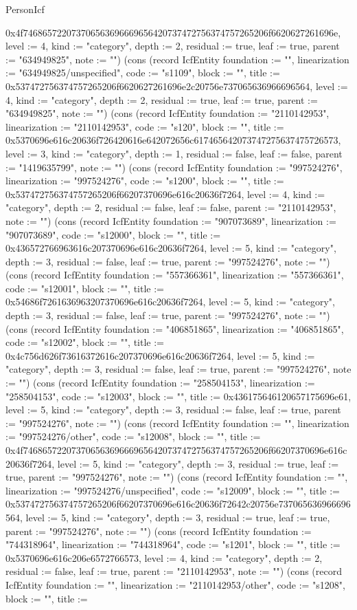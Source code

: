 \begin{lexlean}{PersonIcf}
\begin{semanticmodule}
{0x4f746865722073706563696669656420737472756374757265206f6620627261696e, level := 4, kind := "category", depth := 2, residual := true, leaf := true, parent := "634949825", note := ""}) (cons (record IcfEntity {foundation := "", linearization := "634949825/unspecified", code := "s1109", block := "", title := 0x537472756374757265206f6620627261696e2c20756e737065636966696564, level := 4, kind := "category", depth := 2, residual := true, leaf := true, parent := "634949825", note := ""}) (cons (record IcfEntity {foundation := "2110142953", linearization := "2110142953", code := "s120", block := "", title := 0x5370696e616c20636f726420616e642072656c617465642073747275637475726573, level := 3, kind := "category", depth := 1, residual := false, leaf := false, parent := "1419635799", note := ""}) (cons (record IcfEntity {foundation := "997524276", linearization := "997524276", code := "s1200", block := "", title := 0x537472756374757265206f66207370696e616c20636f7264, level := 4, kind := "category", depth := 2, residual := false, leaf := false, parent := "2110142953", note := ""}) (cons (record IcfEntity {foundation := "907073689", linearization := "907073689", code := "s12000", block := "", title := 0x436572766963616c207370696e616c20636f7264, level := 5, kind := "category", depth := 3, residual := false, leaf := true, parent := "997524276", note := ""}) (cons (record IcfEntity {foundation := "557366361", linearization := "557366361", code := "s12001", block := "", title := 0x54686f7261636963207370696e616c20636f7264, level := 5, kind := "category", depth := 3, residual := false, leaf := true, parent := "997524276", note := ""}) (cons (record IcfEntity {foundation := "406851865", linearization := "406851865", code := "s12002", block := "", title := 0x4c756d626f73616372616c207370696e616c20636f7264, level := 5, kind := "category", depth := 3, residual := false, leaf := true, parent := "997524276", note := ""}) (cons (record IcfEntity {foundation := "258504153", linearization := "258504153", code := "s12003", block := "", title := 0x436175646120657175696e61, level := 5, kind := "category", depth := 3, residual := false, leaf := true, parent := "997524276", note := ""}) (cons (record IcfEntity {foundation := "", linearization := "997524276/other", code := "s12008", block := "", title := 0x4f746865722073706563696669656420737472756374757265206f66207370696e616c20636f7264, level := 5, kind := "category", depth := 3, residual := true, leaf := true, parent := "997524276", note := ""}) (cons (record IcfEntity {foundation := "", linearization := "997524276/unspecified", code := "s12009", block := "", title := 0x537472756374757265206f66207370696e616c20636f72642c20756e737065636966696564, level := 5, kind := "category", depth := 3, residual := true, leaf := true, parent := "997524276", note := ""}) (cons (record IcfEntity {foundation := "744318964", linearization := "744318964", code := "s1201", block := "", title := 0x5370696e616c206e6572766573, level := 4, kind := "category", depth := 2, residual := false, leaf := true, parent := "2110142953", note := ""}) (cons (record IcfEntity {foundation := "", linearization := "2110142953/other", code := "s1208", block := "", title := }
\end{semanticmodule}
\end{lexlean}
